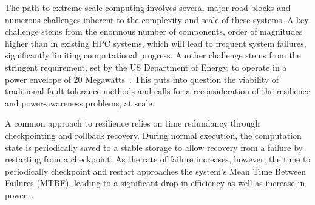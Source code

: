 
The path to extreme scale computing involves several major road blocks and numerous challenges inherent to the complexity and scale of these systems. A key challenge stems from the enormous number of components, order of magnitudes higher than in existing HPC systems, which will lead to frequent system failures, significantly limiting computational progress. Another challenge stems from the stringent requirement, set by the US Department of Energy, to operate in a power envelope of 20 Megawatts~\cite{Bergman08exascalecomputing}. This puts into question the viability of traditional fault-tolerance methods and calls for a reconsideration of the resilience and power-awareness problems, at scale.

A common approach to resilience relies on time redundancy through checkpointing and rollback recovery. During normal execution, the computation state is periodically saved to a stable storage to allow recovery from a failure by restarting from a checkpoint. As the rate of failure increases, however, the time to periodically checkpoint and restart approaches the system's Mean Time Between Failures (MTBF), leading to a significant drop in efficiency as well as increase in power~\cite{4367962,1350776}. %

